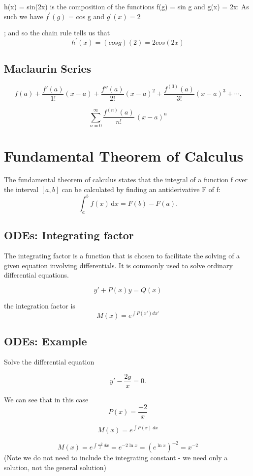\documentclass[12pt, a4paper]{article}
\begin{document}
h(x) = sin(2x) is the composition of the functions
f(g) = sin g and g(x) = 2x:
As such we have
$f^{\prime}(g)$ = cos g and $g^{\prime}(x) = 2$

;
and so the chain rule tells us that
\[h^{\prime}(x) = (cos g)(2) = 2 cos(2x)\]
\subsection{Maclaurin Series}
\[f(a)+\frac {f'(a)}{1!} (x-a)+ \frac{f''(a)}{2!} (x-a)^2+\frac{f^{(3)}(a)}{3!}(x-a)^3+ \cdots.\]

\[\sum_{n=0} ^ {\infty } \frac {f^{(n)}(a)}{n!} \, (x-a)^{n}\]
\section{Fundamental Theorem of Calculus}
The fundamental theorem of calculus states that the integral of a function f over the interval $[a, b]$ can be calculated by finding an antiderivative F of f:
\[\int_a^b f(x)\,\mathrm dx = F(b) - F(a).\]







\subsection{ODEs: Integrating factor}
The integrating factor is a function that is chosen to facilitate the solving of a given equation involving differentials. It is commonly used to solve ordinary differential equations.

\[ y'+ P(x)y = Q(x)\]

the integration factor is
\[M(x) = e^{\int P(x') dx'}\]


\subsection*{ODEs: Example}

Solve the differential equation

\[y'-\frac{2y}{x} = 0.\]

We can see that in this case \[P(x) = \frac{-2}{x}\]

\[ M(x)=e^{\int P(x)\,dx}\]

\[ M(x)=e^{\int \frac{-2}{x}\,dx} = e^{-2 \ln x} = {(e^{\ln x})}^{-2} = x^{-2} \] (Note we do not need to include the integrating constant - we need only a solution, not the general solution)
\end{document}
